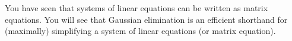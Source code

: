 \chapter{\gaussElimTitle}

\label{gaussElim}

You have seen that systems of linear equations can be written as matrix equations.
You will see that Gaussian elimination is an efficient \gls{shorthand} for (maximally) simplifying a system of linear equations (or matrix equation).




